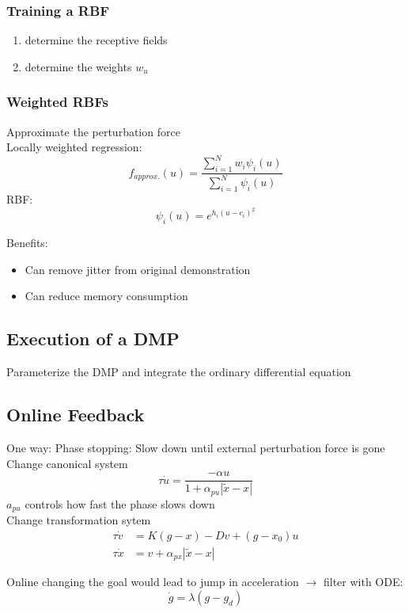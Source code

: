 \subsubsection{Training a RBF}%
\label{ar:ssub:training_a_rbf}
\begin{enumerate}
\item determine the receptive fields
\item determine the weights \(w_u\)
\end{enumerate}

\subsubsection{Weighted RBFs}%
\label{ar:ssub:weighted_rbfs}
Approximate the perturbation force\\
Locally weighted regression:
\[f_\mathit{approx.}(u) = \frac{\sum_{i=1}^N w_i \psi_i(u)}{\sum_{i=1}^N \psi_i(u)}\]
RBF:
\[\psi_i(u) = e^{h_i (u-c_i)^2}\]

Benefits:
\begin{itemize}
\item Can remove jitter from original demonstration
\item Can reduce memory consumption
\end{itemize}

\subsection{Execution of a DMP}%
\label{ar:sub:execution_of_a_dmp}
Parameterize the DMP and integrate the ordinary differential equation

\subsection{Online Feedback}%
\label{ar:sub:online_feedback}
One way: Phase stopping: Slow down until external perturbation force is gone\\
Change canonical system
\[\tau\dot{u} = \frac{-\alpha u}{1 + \alpha_{pu}|\tilde{x} - x|}\]
\(a_{pu}\) controls how fast the phase slows down\\
Change transformation sytem
\begin{align*}
  \tau \dot{v} &= K (g-x) - Dv + (g - x_0)u\\
  \tau \dot{x} &= v + \alpha_{px}|\tilde{x} -x |
\end{align*}

Online changing the goal would lead to jump in acceleration \(\rightarrow\) filter with ODE:
\[\dot{g} = \lambda(g-g_d)\]

